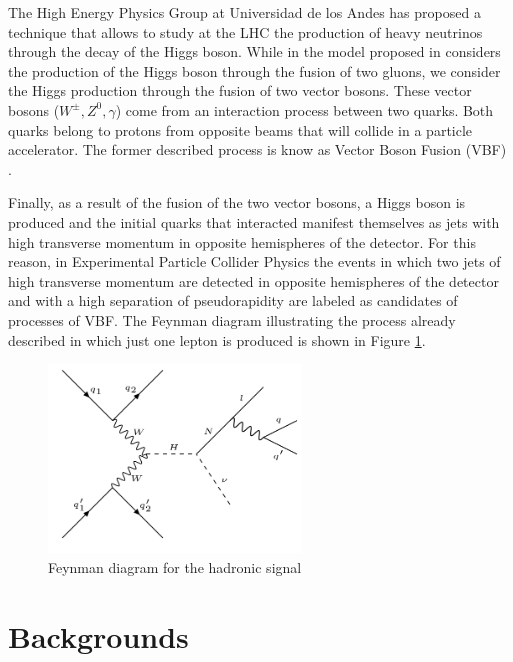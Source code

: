 The High Energy Physics Group at Universidad de los Andes has proposed a technique that allows to study at the LHC the production of heavy neutrinos through the decay of the Higgs boson. While in the model proposed in \cite{Seesaw Mechanism with displace vertices} considers the production of the Higgs boson through the fusion of two gluons, we consider the Higgs production through the fusion of two vector bosons. These vector bosons ($W^{\pm},Z^0,\gamma$) come from an interaction process between two quarks. Both quarks belong to protons from opposite beams that will collide in a particle accelerator. The former described process is know as Vector Boson Fusion (VBF) \cite{VBF processes}. 

Finally, as a result of the fusion of the two vector bosons, a Higgs boson is produced and the initial quarks that interacted manifest themselves as jets with high transverse momentum in opposite hemispheres of the detector. For this reason, in Experimental Particle Collider Physics the events in which two jets of high transverse momentum are detected in opposite hemispheres of the detector and with a high separation of pseudorapidity are labeled as candidates of processes of VBF. The Feynman diagram illustrating the process already described in which just one lepton is produced is shown in Figure \ref{Signal_feynman}.

\begin{figure}[h] \label{Signal_feynman}
\centering
\caption{Feynman diagram for the hadronic signal}
\includegraphics[width=0.6\textwidth]{./Capitulos/Model/signal}  
\end{figure}

 
 
 \section{Backgrounds}
 
